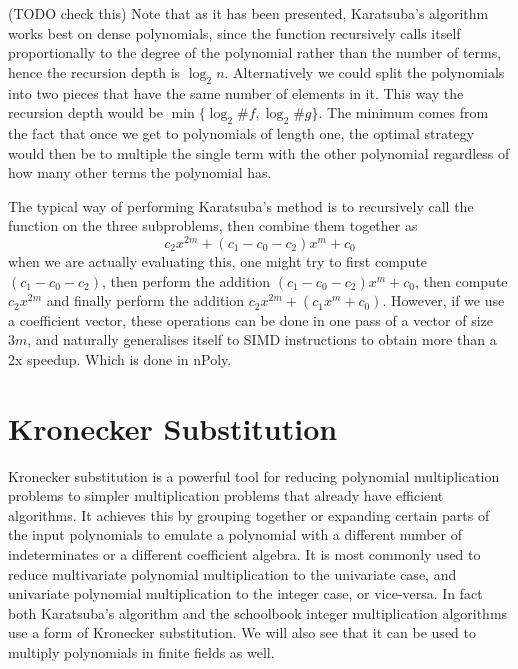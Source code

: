 \medskip

\begin{Implemenation Remarks}
    (TODO check this)
    Note that as it has been presented, Karatsuba's algorithm works best on dense polynomials, since the function recursively calls itself proportionally to the degree of the polynomial rather than the number of terms, hence the recursion depth is $\log_2 n$. Alternatively we could split the polynomials into two pieces that have the same number of elements in it. This way the recursion depth would be $\min\{\log_2 \# f, \log_2 \# g\}$. The minimum comes from the fact that once we get to polynomials of length one, the optimal strategy would then be to multiple the single term with the other polynomial regardless of how many other terms the polynomial has.

    The typical way of performing Karatsuba's method is to recursively call the function on the three subproblems, then combine them together as
    \[
        c_2x^{2m} + (c_1 - c_0 - c_2) x^m + c_0
    \]
    when we are actually evaluating this, one might try to first compute $(c_1 - c_0 - c_2)$, then perform the addition $(c_1 - c_0 - c_2)x^m + c_0$, then compute $c_2x^{2m}$ and finally perform the addition $c_2x^{2m} + (c_1x^m + c_0)$. However, if we use a coefficient vector, these operations can be done in one pass of a vector of size $3m$, and naturally generalises itself to SIMD instructions to obtain more than a 2x speedup. Which is done in nPoly.
\end{Implemenation Remarks}

\medskip

\section{Kronecker Substitution}%
\label{sub:kronecker_substitution}

Kronecker substitution is a powerful tool for reducing polynomial multiplication problems to simpler multiplication problems that already have efficient algorithms. It achieves this by grouping together or expanding certain parts of the input polynomials to emulate a polynomial with a different number of indeterminates or a different coefficient algebra. It is most commonly used to reduce multivariate polynomial multiplication to the univariate case, and univariate polynomial multiplication to the integer case, or vice-versa. In fact both Karatsuba's algorithm and the schoolbook integer multiplication algorithms use a form of Kronecker substitution. We will also see that it can be used to multiply polynomials in finite fields as well. 

